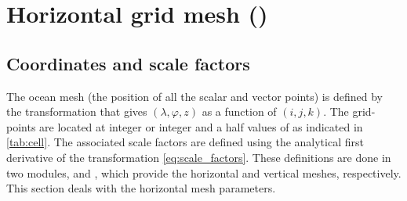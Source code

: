 \documentclass[../main/NEMO_manual]{subfiles}
\begin{document}
\section{Horizontal grid mesh (\protect{})}
\label{sec:DOM_hgr}

\subsection{Coordinates and scale factors}
\label{subsec:DOM_hgr_coord_e}

The ocean mesh (\ie the position of all the scalar and vector points) is defined by
the transformation that gives $(\lambda,\varphi,z)$ as a function of $(i,j,k)$.
The grid-points are located at integer or integer and a half values of as indicated in \autoref{tab:cell}.
The associated scale factors are defined using the analytical first derivative of the transformation
\autoref{eq:scale_factors}.
These definitions are done in two modules,  and ,
which provide the horizontal and vertical meshes, respectively.
This section deals with the horizontal mesh parameters.
\end{document}
